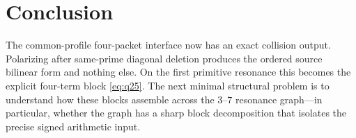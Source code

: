 \section{Conclusion}

The common-profile four-packet interface now has an exact collision output.  Polarizing
after same-prime diagonal deletion produces the ordered source bilinear form and nothing
else.  On the first primitive resonance this becomes the explicit four-term block
\eqref{eq:q25}.  The next minimal structural problem is to understand how these blocks
assemble across the $3$--$7$ resonance graph---in particular, whether the graph has a
sharp block decomposition that isolates the precise signed arithmetic input.
